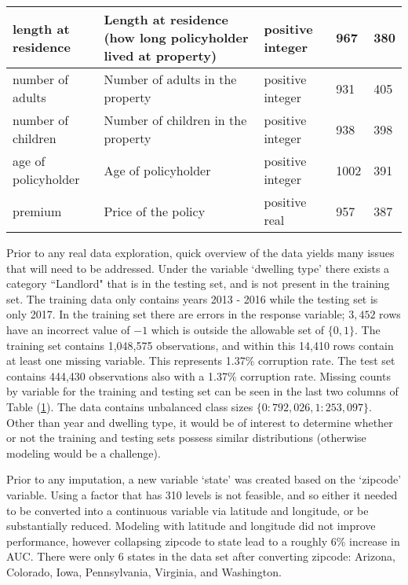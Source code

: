 \documentclass[11pt]{article}
\theoremstyle{remark}
\theoremstyle{definition}
\begin{document}
\begin{table}[]
{\begin{tabular}{|l|l|l|l|l|}
length at residence & Length at residence (how long policyholder lived at property) & positive integer & 967      & 380         \\ \hline
number of adults    & Number of adults in the property & positive integer & 931      & 405         \\ \hline
number of children  & Number of children in the property & positive integer & 938      & 398         \\ \hline
age of policyholder & Age of policyholder & positive integer & 1002     & 391         \\ \hline
premium             & Price of the policy & positive real & 957      & 387            \\ \hline
\end{tabular}}\label{tab:var_tab}
\end{table}
Prior to any real data exploration, quick overview of the data yields many issues that will need to be addressed. Under the variable `dwelling type' there exists a category ``Landlord" that is in the testing set, and is not present in the training set. The training data only contains years 2013 - 2016 while the testing set is only 2017. In the training set there are errors in the response variable; $3,452$ rows have an incorrect value of $-1$ which is outside the allowable set of $\{0,1\}$. The training set contains 1,048,575 observations, and within this 14,410 rows contain at least one missing variable. This represents 1.37\% corruption rate. The test set contains 444,430 observations also with a 1.37\% corruption rate. Missing counts by variable for the training and testing set can be seen in the last two columns of Table (\ref{tab:var_tab}). The data contains unbalanced class sizes $\{0: 792,026, 1: 253,097 \}$. Other than year and dwelling type, it would be of interest to determine whether or not the training and testing sets possess similar distributions (otherwise modeling would be a challenge).

Prior to any imputation, a new variable `state' was created based on the `zipcode' variable. Using a factor that has 310 levels is not feasible, and so either it needed to be converted into a continuous variable via latitude and longitude, or be substantially reduced. Modeling with latitude and longitude did not improve performance, however collapsing zipcode to state lead to a roughly 6\% increase in AUC. There were only 6 states in the data set after converting zipcode: Arizona, Colorado, Iowa, Pennsylvania, Virginia, and Washington.
\end{document}
